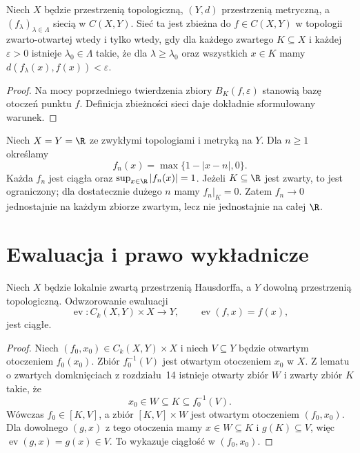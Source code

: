 \begin{wniosek}
\label{cor:topog-odwzorowania-sieci}
Niech $X$ będzie przestrzenią topologiczną,
$(Y,d)$ przestrzenią metryczną,
a $(f_\lambda)_{\lambda\in\Lambda}$
siecią w $C(X,Y)$.
Sieć ta jest zbieżna do $f\in C(X,Y)$
w topologii zwarto-otwartej
wtedy i tylko wtedy, gdy dla każdego
zwartego $K\subseteq X$ i każdej
$\varepsilon>0$ istnieje
$\lambda_0\in\Lambda$ takie, że
dla $\lambda\ge\lambda_0$
oraz wszystkich $x\in K$ mamy
$d(f_\lambda(x),f(x))<\varepsilon$.
\end{wniosek}
\begin{proof}
Na mocy poprzedniego twierdzenia
zbiory $B_K(f,\varepsilon)$ stanowią
bazę otoczeń punktu $f$.
Definicja zbieżności sieci daje
dokładnie sformułowany warunek.
\end{proof}

\begin{przyklad}
\label{ex:topog-odwzorowania-gorki-uciekajace}
Niech $X=Y=\R$ ze zwykłymi
topologiami i metryką na $Y$.
Dla $n\ge1$ określamy
\[
f_n(x)=\max\{1-|x-n|,0\}.
\]
Każda $f_n$ jest ciągła oraz
$\sup_{x\in\R}|f_n(x)|=1$.
Jeżeli $K\subseteq\R$ jest zwarty,
to jest ograniczony; dla
dostatecznie dużego $n$
mamy $f_n|_K=0$.
Zatem $f_n\to0$ jednostajnie
na każdym zbiorze zwartym,
lecz nie jednostajnie na całej $\R$.
\end{przyklad}

\section{Ewaluacja i prawo wykładnicze}
\label{sec:topog-odwzorowania-ewaluacja}

\begin{twierdzenie}
\label{thm:topog-odwzorowania-ewaluacja}
Niech $X$ będzie lokalnie zwartą
przestrzenią Hausdorffa, a $Y$
dowolną przestrzenią topologiczną.
Odwzorowanie ewaluacji
\[
\operatorname{ev}\colon
C_k(X,Y)\times X\to Y,\qquad
\operatorname{ev}(f,x)=f(x),
\]
jest ciągłe.
\end{twierdzenie}
\begin{proof}
Niech $(f_0,x_0)\in C_k(X,Y)\times X$
i niech $V\subseteq Y$ będzie otwartym
otoczeniem $f_0(x_0)$.
Zbiór $f_0^{-1}(V)$ jest otwartym
otoczeniem $x_0$ w $X$.
Z lematu o zwartych domknięciach
z rozdziału~14 istnieje
otwarty zbiór $W$ i zwarty zbiór $K$
takie, że
\[
x_0\in W\subseteq K
\subseteq f_0^{-1}(V).
\]
Wówczas $f_0\in[K,V]$,
a zbiór $[K,V]\times W$
jest otwartym otoczeniem $(f_0,x_0)$.
Dla dowolnego $(g,x)$ z tego
otoczenia mamy $x\in W\subseteq K$
i $g(K)\subseteq V$, więc
$\operatorname{ev}(g,x)=g(x)\in V$.
To wykazuje ciągłość w $(f_0,x_0)$.
\end{proof}

